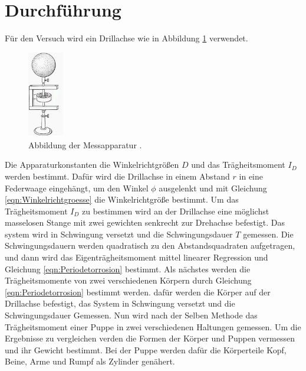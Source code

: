 \section{Durchführung}
\label{sec:Durchführung}
Für den Versuch wird ein Drillachse wie in Abbildung \ref{fig:Drillachse} verwendet.
\begin{figure}
  \centering
  \includegraphics[width=0.14\textwidth]{Drillachse.png}
  \caption{Abbildung der Messapparatur \cite{sample}.}
  \label{fig:Drillachse}
\end{figure}
Die Apparaturkonstanten die Winkelrichtgrößen $D$ und das Trägheitsmoment $I_D$ werden bestimmt.
Dafür wird die Drillachse in einem Abstand $r$ in eine Federwaage eingehängt, um den Winkel $\phi$
ausgelenkt und mit Gleichung \eqref{eqn:Winkelrichtgroesse} die Winkelrichtgröße bestimmt.
Um das Trägheitsmoment $I_D$ zu bestimmen wird an der Drillachse eine möglichst masselosen Stange
mit zwei gewichten  senkrecht zur Drehachse befestigt. Das system wird in Schwingung
versetzt und die Schwingungsdauer $T$ gemessen. Die Schwingungsdauern werden quadratisch
zu den Abstandsquadraten aufgetragen, und dann wird das Eigenträgheitsmoment mittel
linearer Regression und Gleichung \eqref{eqn:Periodetorrosion} bestimmt.
Als nächstes werden die Trägheitsmomente von zwei verschiedenen Körpern durch
Gleichung \eqref{eqn:Periodetorrosion} bestimmt werden. dafür werden die Körper auf der Drillachse
befestigt, das System in Schwingung versetzt und die Schwingungsdauer Gemessen.
Nun wird nach der Selben Methode das Trägheitsmoment einer Puppe in zwei verschiedenen
Haltungen gemessen. Um die Ergebnisse zu vergleichen verden die Formen der Körper
und Puppen vermessen und ihr Gewicht bestimmt. Bei der Puppe werden dafür die Körperteile
Kopf, Beine, Arme und Rumpf als Zylinder genähert.
